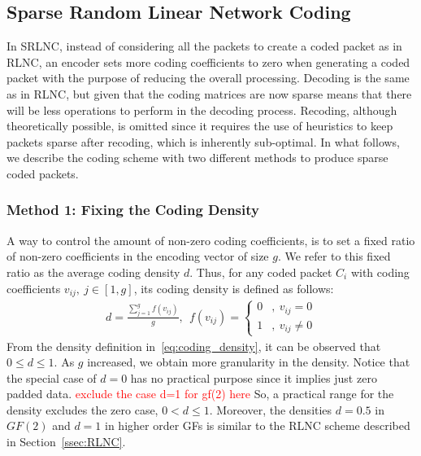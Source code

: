 \subsection{Sparse Random Linear Network Coding}

In \ac{SRLNC}, instead of considering all the packets to create a
coded packet as in \ac{RLNC}, an encoder sets more coding coefficients
to zero when generating a coded packet with the purpose of reducing
the overall processing.  Decoding is the same as in \ac{RLNC}, but
given that the coding matrices are now sparse means that there will be less
operations to perform in the decoding process.  Recoding, although
theoretically possible, is omitted since it requires the use of
heuristics to keep packets sparse after recoding, which is inherently
sub-optimal.
In what follows, we describe the coding scheme with two
different methods to produce sparse coded packets.

\subsubsection{Method 1: Fixing the Coding Density}
A way to control the amount of non-zero coding coefficients, is to set a
fixed ratio of non-zero coefficients in the encoding vector of size $g$. We
refer to this fixed ratio as the average coding density $d$. Thus, for any
coded packet $C_i$ with coding coefficients $v_{ij},\ j \in [1,g]$, its
coding density is defined as follows:
%
\begin{align}
\label{eq:coding_density}
d = \frac{\sum_{j=1}^{g} f(v_{ij})}{g},\ \
    f(v_{ij}) =
    \begin{cases}
        0 &,\ v_{ij} = 0 \\
        1 &,\ v_{ij} \neq 0
    \end{cases}
\end{align}
%
From the density definition in~\eqref{eq:coding_density}, it can be
observed that $0 \leq d \leq 1$. As $g$ increased, we obtain more
granularity in the density. Notice that the special case of  $d = 0$ has no
practical purpose since it implies just zero padded data.
\textcolor{red}{exclude the case d=1 for gf(2) here}
So, a practical
range for the density excludes the zero case, $0 < d \leq 1$.
Moreover, the densities $d=0.5$ in $GF(2)$ and $d=1$ in higher order
\ac{GF}s is similar to the \ac{RLNC} scheme described in Section~\ref{ssec:RLNC}.

